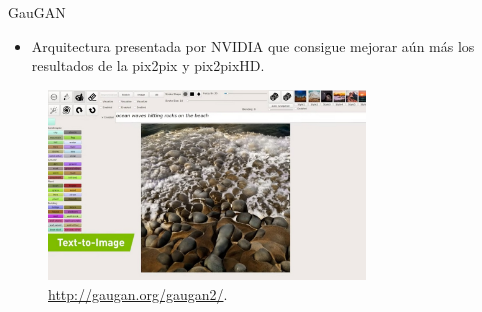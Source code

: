 \begin{frame}{GauGAN\cite{park2019semantic}}

    \begin{itemize}
        \item Arquitectura presentada por \alert{NVIDIA} que consigue mejorar aún más los resultados de la \alert{pix2pix} y \alert{pix2pixHD}.
    \end{itemize}
    
    \begin{figure}
        \centering
        \includegraphics[width=0.75\textwidth]{Slides/figures/GAN/GauGAN2.jpg}
        \caption{\href{http://gaugan.org/gaugan2/}{http://gaugan.org/gaugan2/}.}
    \end{figure}
    
\end{frame}

